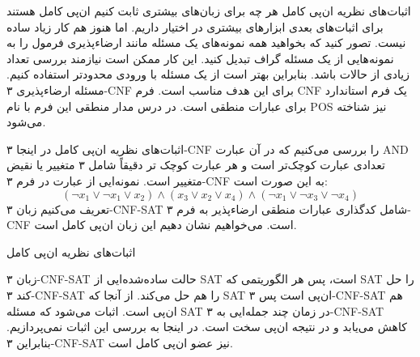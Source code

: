 \begin{itemframe}{اثبات‌های نظریه ان‌پی کامل}
\itm
هر چه برای زبان‌های بیشتری ثابت کنیم ان‌پی کامل هستند برای اثبات‌های بعدی ابزارهای بیشتری در اختیار داریم. اما هنوز هم کار زیاد ساده نیست.
\itm
تصور کنید که بخواهید همه نمونه‌های یک مسئله مانند ارضاءپذیری فرمول را به نمونه‌هایی از یک مسئله گراف تبدیل کنید. این کار ممکن است نیازمند بررسی تعداد زیادی از حالات باشد.
\itm
بنابراین بهتر است از یک مسئله با ورودی محدودتر استفاده کنیم. مسئله ارضاءپذیری ۳-CNF برای این هدف مناسب است.
\itm
فرم CNF یک فرم استاندارد برای عبارات منطقی است. در درس مدار منطقی این فرم با نام POS نیز شناخته می‌شود.
\end{itemframe}

\begin{itemframe}{اثبات‌های نظریه ان‌پی کامل}
\itm
در اینجا ۳-CNF را بررسی می‌کنیم که در آن عبارت AND تعدادی عبارت کوچک‌تر است و هر عبارت کوچک تر دقیقاً شامل ۳ متغییر یا نقیض متغییر است. نمونه‌ایی از عبارت در فرم ۳-CNF به این صورت است:
$$
(\lnot x_1 \lor \lnot x_1 \lor x_2) \land (x_3 \lor x_2 \lor x_4) \land (\lnot x_1 \lor \lnot x_3 \lor \lnot x_4)
$$
\itm
تعریف می‌کنیم زبان ۳-CNF-SAT شامل کدگذاری عبارات منطقی ارضاءپذیر به فرم ۳-CNF‌ است. می‌خواهیم نشان دهیم این زبان ان‌پی کامل است.
\end{itemframe}

\begin{itemframe}{اثبات‌های نظریه ان‌پی کامل}

 \itm
زبان ۳-CNF-SAT حالت ساد‌ه‌شده‌ایی از SAT است، پس هر الگوریتمی که SAT را حل کند ۳-CNF-SAT را هم حل می‌کند. از آنجا که SAT ان‌پی است پس ۳-CNF-SAT هم ان‌پی است.
 \itm
اثبات می‌شود که مسئله SAT در زمان چند جمله‌ایی به ۳-CNF-SAT کاهش می‌یابد و در نتیجه ان‌پی سخت است.
در اینجا به بررسی این اثبات نمی‌پردازیم.
 \itm
بنابراین ۳-CNF-SAT نیز عضو ان‌پی کامل است.
\end{itemframe}

